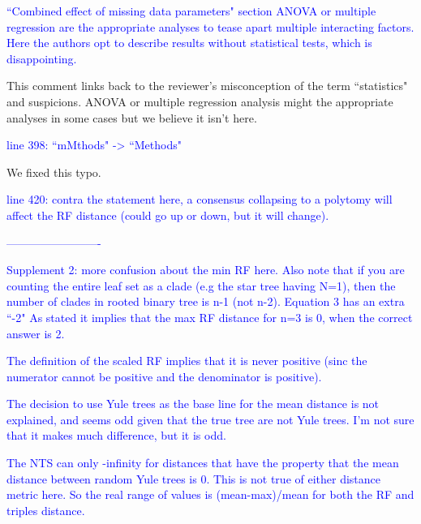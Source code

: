 \documentclass[11pt]{letter}
\begin{document}
\begin{letter}{}


\textcolor{blue}{``Combined effect of missing data parameters" section ANOVA or multiple regression are the appropriate analyses to tease apart multiple interacting factors. Here the authors opt to describe results without statistical tests, which is disappointing.}

This comment links back to the reviewer's misconception of the term ``statistics" and suspicions. ANOVA or multiple regression analysis might the appropriate analyses in some cases but we believe it isn't here. %

\textcolor{blue}{line 398: ``mMthods" -> ``Methods"}

We fixed this typo.

\textcolor{blue}{line 420: contra the statement here, a consensus collapsing to a polytomy will affect the RF distance (could go up or down, but it will change).}


\textcolor{blue}{-------------------------}

\textcolor{blue}{Supplement 2:}
\textcolor{blue}{more confusion about the min RF here. Also note that if you are counting the entire leaf set as a clade (e.g the star tree having N=1), then the number of clades in rooted binary tree is n-1 (not n-2). Equation 3 has an extra ``-2" As stated it implies that the max RF distance for n=3 is 0, when the correct answer is 2.}


\textcolor{blue}{The definition of the scaled RF implies that it is never positive (sinc the numerator cannot be positive and the denominator is positive).}


\textcolor{blue}{The decision to use Yule trees as the base line for the mean distance is not explained, and seems odd given that the true tree are not Yule trees. I'm not sure that it makes much difference, but it is odd.}


\textcolor{blue}{The NTS can only -infinity for distances that have the property that the mean distance between random Yule trees is 0. This is not true of either distance metric here. So the real range of values is (mean-max)/mean for both the RF and triples distance.}


\end{letter}
\end{document}
